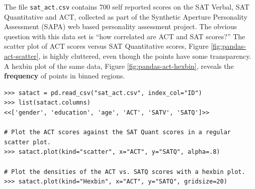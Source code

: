 The file \texttt{sat\_act.csv} contains 700 self reported scores on the SAT Verbal, SAT Quantitative and ACT, collected as part of the Synthetic Aperture Personality Assessment (SAPA) web based personality assessment project.
The obvious question with this data set is ``how correlated are ACT and SAT scores?''
The scatter plot of ACT scores versus SAT Quantitative scores, Figure \ref{fig:pandas-act-scatter}, is highly cluttered, even though the points have some transparency.
A hexbin plot of the same data, Figure \ref{fig:pandas-act-hexbin}, reveals the \textbf{frequency} of points in binned regions.

\newpage

\begin{lstlisting}
>>> satact = pd.read_csv("sat_act.csv", index_col="ID")
>>> list(satact.columns)
<<['gender', 'education', 'age', 'ACT', 'SATV', 'SATQ']>>

# Plot the ACT scores against the SAT Quant scores in a regular scatter plot.
>>> satact.plot(kind="scatter", x="ACT", y="SATQ", alpha=.8)

# Plot the densities of the ACT vs. SATQ scores with a hexbin plot.
>>> satact.plot(kind="Hexbin", x="ACT", y="SATQ", gridsize=20)
\end{lstlisting}

